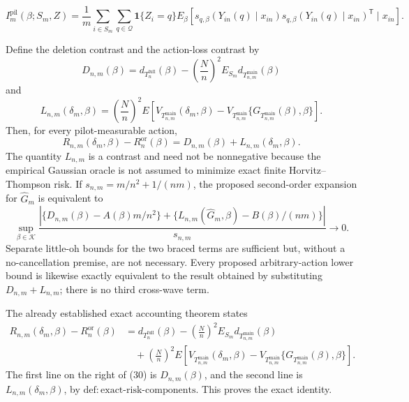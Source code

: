 \[
I_m^{\mathrm{pil}}(\beta;S_m,Z)
=\frac1m\sum_{i\in S_m}\sum_{q\in\mathcal Q}
\mathbf 1\{Z_i=q\}
E_\beta\!\left[
s_{q,\beta}(Y_{in}(q)\mid x_{in})
s_{q,\beta}(Y_{in}(q)\mid x_{in})^{\mathsf T}
\mid x_{in}
\right].
\]

Define the deletion contrast and the action-loss contrast by
\[
D_{n,m}(\beta)
=d_{T_n^{\mathrm{full}}}(\beta)
-\left(\frac Nn\right)^2
E_{S_m}d_{T_{n,m}^{\mathrm{main}}}(\beta)
\]
and
\[
L_{n,m}(\delta_m,\beta)
=\left(\frac Nn\right)^2
E\!\left[
V_{T_{n,m}^{\mathrm{main}}}(\delta_m,\beta)
-V_{T_{n,m}^{\mathrm{main}}}
\{G_{T_{n,m}^{\mathrm{main}}}(\beta),\beta\}
\right].
\]
Then, for every pilot-measurable action,
\[
R_{n,m}(\delta_m,\beta)-R_n^{\mathrm{or}}(\beta)
=D_{n,m}(\beta)+L_{n,m}(\delta_m,\beta).
\]
The quantity \(L_{n,m}\) is a contrast and need not be nonnegative because the empirical Gaussian oracle is not assumed to minimize exact finite Horvitz--Thompson risk.  If \(s_{n,m}=m/n^2+1/(nm)\), the proposed second-order expansion for \(\widehat G_m\) is equivalent to
\[
\sup_{\beta\in\mathcal K}
\frac{\left|
\{D_{n,m}(\beta)-A(\beta)m/n^2\}
+\{L_{n,m}(\widehat G_m,\beta)-B(\beta)/(nm)\}
\right|}{s_{n,m}}\longrightarrow0.
\]
Separate little-oh bounds for the two braced terms are sufficient but, without a no-cancellation premise, are not necessary.  Every proposed arbitrary-action lower bound is likewise exactly equivalent to the result obtained by substituting \(D_{n,m}+L_{n,m}\); there is no third cross-wave term.

The already established exact accounting theorem states
\[
\begin{aligned}
R_{n,m}(\delta_m,\beta)-R_n^{\mathrm{or}}(\beta)
&=d_{T_n^{\mathrm{full}}}(\beta)
-\left(\frac Nn\right)^2
E_{S_m}d_{T_{n,m}^{\mathrm{main}}}(\beta)\\
&\quad+
\left(\frac Nn\right)^2E\!\left[
V_{T_{n,m}^{\mathrm{main}}}(\delta_m,\beta)
-V_{T_{n,m}^{\mathrm{main}}}
\{G_{T_{n,m}^{\mathrm{main}}}(\beta),\beta\}
\right].
\end{aligned}
\tag{30}
\]
The first line on the right of (30) is \(D_{n,m}(\beta)\), and the second line is \(L_{n,m}(\delta_m,\beta)\), by
\(\mathrm{def{:}exact\text{-}risk\text{-}components}\).  This proves the exact identity.


